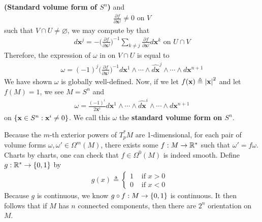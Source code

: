 \documentclass{report}
\begin{document}
\begin{Example}{\textbf{(Standard volume form of $S^n$)}}{}
and 
\begin{align*}
\frac{\partial f}{\partial \textbf{x}^j}\neq 0\text{ on }V
\end{align*}
such that $V \cap U\neq \varnothing$, we may compute by  that 
\begin{align*}
d\textbf{x}^j = - \Big( \frac{\partial f}{\partial \textbf{x}^j} \Big)^{-1} \sum_{k\neq j} \frac{\partial f}{\partial \textbf{x}^j}  d\textbf{x}^k\text{ on }U \cap V
\end{align*}
Therefore, the expression of $\omega$ in  on $V \cap U$ is equal to 
\begin{align*}
  \omega= (-1)^j \Big( \frac{\partial f}{\partial \textbf{x}^j} \Big)^{-1}d\textbf{x}^1 \wedge  \cdots \wedge  \widehat{d \textbf{x}}^j \wedge  \cdots \wedge  d\textbf{x}^{n+1}    
\end{align*}
We have shown $\omega$ is globally well-defined. Now, if we let $f(\textbf{x})\triangleq \left|\textbf{x}\right|^2$ and let $f(M)=1$, we see $M=S^n$ and  
 \begin{align*}
\omega= \frac{(-1)^i}{2\textbf{x}^i} d\textbf{x}^1 \wedge  \cdots \wedge \widehat{d \textbf{x}}^i \wedge \cdots \wedge  d\textbf{x}^{n+1}    
\end{align*}
on $\{ \textbf{x} \in S^n: \textbf{x}^i \neq 0 \}$. We call this $\omega$ the \textbf{standard volume form on $S^n$}. 
\end{Example}
\begin{mdframed}
Because the $m$-th exterior powers of $T_p^*M$ are 1-dimensional, for each pair of volume forms  $\omega,\omega' \in \Omega^m(M)$, there exists some $f:M\rightarrow \mathbb{R}^*$ such that $\omega'=f \omega$. Charts by charts, one can check that $f\in \Omega^0(M)$ is indeed smooth. Define $g:\mathbb{R}^*\rightarrow \{ 0,1 \}$ by 
  \begin{align*}
  g(x)\triangleq \begin{cases}
    1& \text{ if $x>0$ }\\
    0& \text{ if $x<0$ }
  \end{cases}
  \end{align*}
Because $g$ is continuous, we know  $g \circ f: M\rightarrow \{ 0,1 \}$ is continuous. It then follows that if $M$ has  $n$ connected components, then there are $2^n$ orientation on  $M$. 
\end{mdframed}
\end{document}
